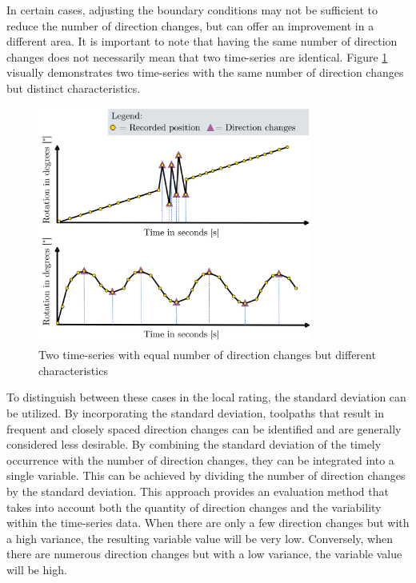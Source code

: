 In certain cases, adjusting the boundary conditions may not be sufficient to reduce the number of direction changes, but can offer an improvement in a different area. It is important to note that having the same number of direction changes does not necessarily mean that two time-series are identical. Figure \ref{dirchangeSTD} visually demonstrates two time-series with the same number of direction changes but distinct characteristics.

\begin{figure}[H]
	\centerline{\includegraphics[width=0.8\textwidth]{figures/DirSTD.png}}
	\caption{Two time-series with equal number of direction changes but different characteristics}
	\label{dirchangeSTD}
\end{figure}

To distinguish between these cases in the local rating, the standard deviation can be utilized. By incorporating the standard deviation, toolpaths that result in frequent and closely spaced direction changes can be identified and are generally considered less desirable. By combining the standard deviation of the timely occurrence with the number of direction changes, they can be integrated into a single variable. This can be achieved by dividing the number of direction changes by the standard deviation. %
This approach provides an evaluation method that takes into account both the quantity of direction changes and the variability within the time-series data. When there are only a few direction changes but with a high variance, the resulting variable value will be very low. Conversely, when there are numerous direction changes but with a low variance, the variable value will be high.




